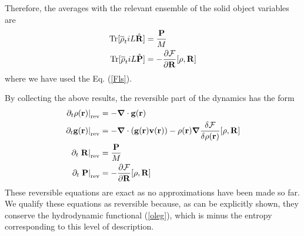 \documentclass[b5paper,openright,11pt]{book}
\begin{document}
Therefore, the averages with the relevant ensemble of the solid object variables are
\begin{align}
{\rm Tr}[\overline{\rho}_t  iL\hat{\bf R}] 
&=\frac{\bf P}{M}
\nonumber\\
{\rm Tr}[\overline{\rho}_t  iL\hat{\bf P}] 
&=-\frac{\partial {\cal F}}{\partial {\bf R}}[\rho,{\bf R}]
\end{align}
where we have used the Eq. (\ref{Fls}).

By collecting the  above results, the reversible part  of the dynamics
has the form
\begin{align}
\left.  \partial_t\rho({\bf r})\right|_{\rm rev}&=-\boldsymbol{\nabla}\cdot{\bf g}({\bf r})
\nonumber\\
\left.  \partial_t{\bf g}({\bf r})\right|_{\rm rev}&=-\boldsymbol{\nabla}\cdot\left({\bf g}({\bf r}){\bf v}({\bf r})\right)
-\rho({\bf r})\boldsymbol{\nabla} \frac{\delta {\cal F}}{\delta\rho({\bf r})}[\rho,{\bf R}]
\nonumber\\
\partial_t\left. {\bf R}\right|_{\rm rev}&=\frac{\bf P}{M}
\nonumber\\
\partial_t\left.{\bf P}\right|_{\rm rev}&=-\frac{\partial {\cal F}}{\partial {\bf R}}[\rho,{\bf R}]
\label{rev}
\end{align}
These reversible  equations are exact  as no approximations  have been
made so far. We qualify these  equations as reversible because, as can
be  explicitly  shown,  they   conserve  the  hydrodynamic  functional
(\ref{oleg}), which  is minus the entropy corresponding
  to this level of description.
\end{document}
